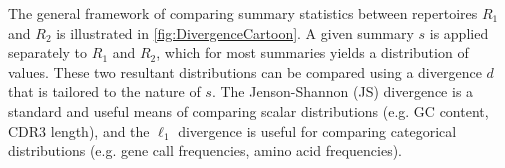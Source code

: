 \documentclass{article}
\begin{document}
The general framework of comparing summary statistics between repertoires $R_1$ and $R_2$ is illustrated in \ref{fig:DivergenceCartoon}.
A given summary $s$ is applied separately to $R_1$ and $R_2$, which for most summaries yields a distribution of values.
These two resultant distributions can be compared using a divergence $d$ that is tailored to the nature of $s$.
The Jenson-Shannon (JS) divergence is a standard and useful means of comparing scalar distributions (e.g. GC content, CDR3 length), and the $\ell_1$ divergence is useful for comparing categorical distributions (e.g. gene call frequencies, amino acid frequencies).
\end{document}
